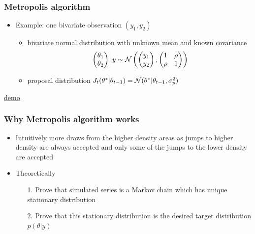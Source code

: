 \documentclass[10pt]{beamer}
\begin{document}
\begin{frame}

\frametitle{ Metropolis algorithm}

  \begin{itemize}
  \item Example: one bivariate observation $(y_1,y_2)$
    \begin{itemize}
    \item bivariate normal distribution with unknown mean and known
      covariance
       \begin{equation*}
         \left.
         \begin{pmatrix}
           \theta_1\\
           \theta_2
         \end{pmatrix}
         \right| y \sim
         \mathcal{N}\left(
           \begin{pmatrix}
             y_1\\
             y_2
           \end{pmatrix},
           \begin{pmatrix}
             1 & \rho\\
             \rho & 1
         \end{pmatrix}
       \right)
       \end{equation*}
     \item proposal distribution
       $J_t(\theta^{*}|\theta_{t-1})=\mathcal{N}(\theta^{*}|\theta_{t-1},\sigma_p^2)$
     \end{itemize}
   \end{itemize}

  \center
  \href{https://chi-feng.github.io/mcmc-demo/app.html?algorithm=RandomWalkMH&target=standard}{demo}

\end{frame}

 \begin{frame}

\frametitle{Why Metropolis algorithm works}

  \begin{itemize}
  \item Intuitively more draws from the higher density areas as
    jumps to higher density are always accepted and only some of the
    jumps to the lower density are accepted
    \vspace{5mm}
    \pause
  \item Theoretically
    \begin{itemize}
    \item[1.] Prove that simulated series is a Markov chain
      which has unique stationary distribution
    \item[2.] Prove that this stationary distribution is the desired target distribution $p(\theta|y)$
    \end{itemize}
\end{itemize}

\end{frame}
\end{document}
